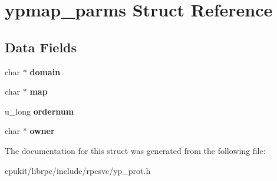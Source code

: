 \hypertarget{structypmap__parms}{}\section{ypmap\+\_\+parms Struct Reference}
\label{structypmap__parms}
\subsection*{Data Fields}
\begin{DoxyCompactItemize}
\item 
\mbox{\label{structypmap__parms_a082b1c4208528e4c87a899ddf67a6779}} 
char $\ast$ {\bfseries domain}
\item 
\mbox{\label{structypmap__parms_aed8df4f5e99bdd43c001a172957679fd}} 
char $\ast$ {\bfseries map}
\item 
\mbox{\label{structypmap__parms_a08538a929457171a6e5f40787baaa5b1}} 
u\+\_\+long {\bfseries ordernum}
\item 
\mbox{\label{structypmap__parms_a55245f2824054b619a275d869391d6c4}} 
char $\ast$ {\bfseries owner}
\end{DoxyCompactItemize}


The documentation for this struct was generated from the following file\+:\begin{DoxyCompactItemize}
\item 
cpukit/librpc/include/rpcsvc/yp\+\_\+prot.\+h\end{DoxyCompactItemize}
